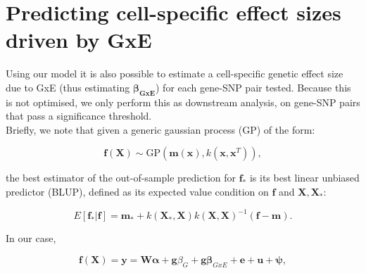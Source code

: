 



\section{Predicting cell-specific effect sizes driven by GxE}

Using our model it is also possible to estimate a cell-specific genetic effect size due to GxE (thus estimating $\boldsymbol{\beta_{GxE}}$) for each gene-SNP pair tested.
Because this is not optimised, we only perform this as downstream analysis, on gene-SNP pairs that pass a significance threshold.\\

Briefly, we note that given a generic gaussian process ($\mathrm{GP}$) of the form:
 
\begin{equation}
    \mathbf{f}(\mathbf{X}) \sim \mathrm{GP}(\mathbf{m}(\mathbf{x}), k(\mathbf{x},\mathbf{x}^T)),
\end{equation}

the best estimator of the out-of-sample prediction for $\mathbf{f}_*$  is its best linear unbiased predictor (BLUP), defined as its expected value condition on $\mathbf{f}$ and $\mathbf{X},\mathbf{X}_*$:

\begin{equation}
    E[\mathbf{f}_*|\mathbf{f}] = \mathbf{m}_* +k(\mathbf{X}_*,\mathbf{X})k(\mathbf{X},\mathbf{X})^{-1}(\mathbf{f}-\mathbf{m}).
\end{equation}

In our case,

\begin{equation}
    \mathbf{f}(\mathbf{X}) = \mathbf{y} = \mathbf{W}\boldsymbol{\alpha}+\mathbf{g}\beta_G+\mathbf{g}\boldsymbol{\beta}_{GxE}+\mathbf{e} + \mathbf{u} + \boldsymbol{\psi},
\end{equation}

